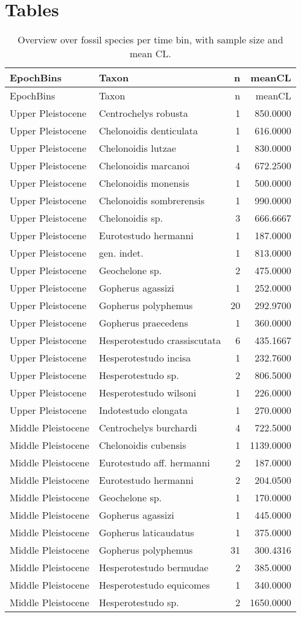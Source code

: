 \section{Tables}
\begin{longtable}[]{@{}llrr@{}}
	\caption[Species per time bins]{Overview over fossil species per time bin, with sample size and
		mean CL.}
	\label{tab:SpecBins}\tabularnewline
	\toprule
	EpochBins & Taxon & n & meanCL\tabularnewline
	\midrule
	\endfirsthead
	\toprule
	EpochBins & Taxon & n & meanCL\tabularnewline
	\midrule
	\endhead
	Upper Pleistocene & Centrochelys robusta & 1 & 850.0000\tabularnewline
	Upper Pleistocene & Chelonoidis denticulata & 1 &
	616.0000\tabularnewline
	Upper Pleistocene & Chelonoidis lutzae & 1 & 830.0000\tabularnewline
	Upper Pleistocene & Chelonoidis marcanoi & 4 & 672.2500\tabularnewline
	Upper Pleistocene & Chelonoidis monensis & 1 & 500.0000\tabularnewline
	Upper Pleistocene & Chelonoidis sombrerensis & 1 &
	990.0000\tabularnewline
	Upper Pleistocene & Chelonoidis sp. & 3 & 666.6667\tabularnewline
	Upper Pleistocene & Eurotestudo hermanni & 1 & 187.0000\tabularnewline
	Upper Pleistocene & gen. indet. & 1 & 813.0000\tabularnewline
	Upper Pleistocene & Geochelone sp. & 2 & 475.0000\tabularnewline
	Upper Pleistocene & Gopherus agassizi & 1 & 252.0000\tabularnewline
	Upper Pleistocene & Gopherus polyphemus & 20 & 292.9700\tabularnewline
	Upper Pleistocene & Gopherus praecedens & 1 & 360.0000\tabularnewline
	Upper Pleistocene & Hesperotestudo crassiscutata & 6 &
	435.1667\tabularnewline
	Upper Pleistocene & Hesperotestudo incisa & 1 & 232.7600\tabularnewline
	Upper Pleistocene & Hesperotestudo sp. & 2 & 806.5000\tabularnewline
	Upper Pleistocene & Hesperotestudo wilsoni & 1 & 226.0000\tabularnewline
	Upper Pleistocene & Indotestudo elongata & 1 & 270.0000\tabularnewline
	Middle Pleistocene & Centrochelys burchardi & 4 &
	722.5000\tabularnewline
	Middle Pleistocene & Chelonoidis cubensis & 1 & 1139.0000\tabularnewline
	Middle Pleistocene & Eurotestudo aff. hermanni & 2 &
	187.0000\tabularnewline
	Middle Pleistocene & Eurotestudo hermanni & 2 & 204.0500\tabularnewline
	Middle Pleistocene & Geochelone sp. & 1 & 170.0000\tabularnewline
	Middle Pleistocene & Gopherus agassizi & 1 & 445.0000\tabularnewline
	Middle Pleistocene & Gopherus laticaudatus & 1 & 375.0000\tabularnewline
	Middle Pleistocene & Gopherus polyphemus & 31 & 300.4316\tabularnewline
	Middle Pleistocene & Hesperotestudo bermudae & 2 &
	385.0000\tabularnewline
	Middle Pleistocene & Hesperotestudo equicomes & 1 &
	340.0000\tabularnewline
	Middle Pleistocene & Hesperotestudo sp. & 2 & 1650.0000\tabularnewline

\end{longtable}
